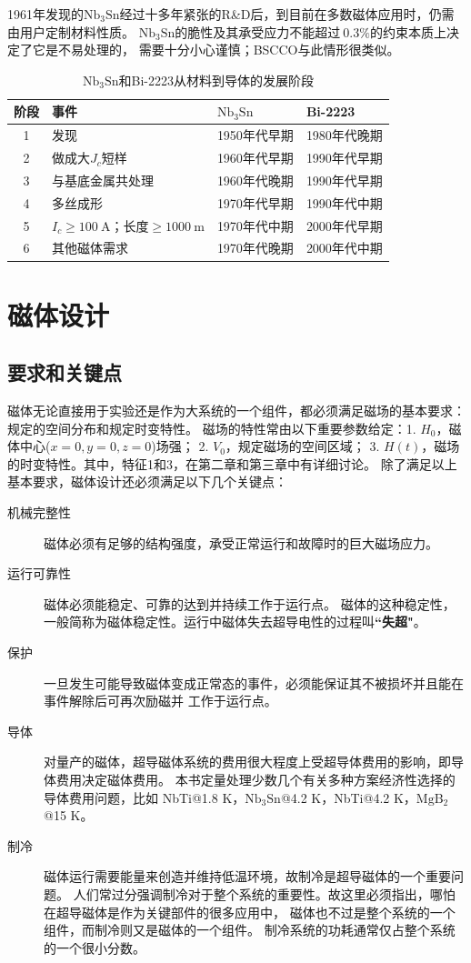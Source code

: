 1961年发现的$\mathrm{Nb_3Sn}$经过十多年紧张的R\&D后，到目前在多数磁体应用时，仍需由用户定制材料性质。
$\mathrm{Nb_3Sn}$的脆性及其承受应力不能超过$~0.3\%$的约束本质上决定了它是不易处理的，
需要十分小心谨慎；BSCCO与此情形很类似。
\begin{table}[htbp]\small
  \centering
  \caption{$\mathrm{Nb_3Sn}$和Bi-2223从材料到导体的发展阶段} \label{scstage}
\begin{tabular}{|c|l|l|l|}
  \hline
  阶段&事件& $\mathrm{Nb_3Sn}$ &Bi-2223 \\ \hline
1 & 发现 & 1950年代早期& 1980年代晚期 \\ \hline
2 & 做成大$J_c$短样 & 1960年代早期 & 1990年代早期\\ \hline
3 &与基底金属共处理&1960年代晚期&1990年代早期\\ \hline
4 &多丝成形&1970年代早期&1990年代中期\\ \hline
5 &$I_c\ge 100\ \mathrm{A}$；长度$\ge 1000\ \mathrm{m}$ &1970年代中期&2000年代早期\\ \hline
6 &其他磁体需求&1970年代晚期&2000年代中期\\
  \hline
\end{tabular}
\end{table}


\section{磁体设计}
\subsection{要求和关键点}
磁体无论直接用于实验还是作为大系统的一个组件，都必须满足磁场的基本要求：规定的空间分布和规定时变特性。
磁场的特性常由以下重要参数给定：1. $H_0$，磁体中心($x=0, y=0, z=0$)场强；
2. $V_0$，规定磁场的空间区域；
3. $H(t)$，磁场的时变特性。其中，特征1和3，在第二章和第三章中有详细讨论。
除了满足以上基本要求，磁体设计还必须满足以下几个关键点：
\begin{description}
  \item[机械完整性] 磁体必须有足够的结构强度，承受正常运行和故障时的巨大磁场应力。
  \item[运行可靠性] 磁体必须能稳定、可靠的达到并持续工作于运行点。
  磁体的这种稳定性，一般简称为磁体稳定性。运行中磁体失去超导电性的过程叫\textbf{``失超"}。
  \item[保护] 一旦发生可能导致磁体变成正常态的事件，必须能保证其不被损坏并且能在事件解除后可再次励磁并
  工作于运行点。
  \item[导体] 对量产的磁体，超导磁体系统的费用很大程度上受超导体费用的影响，即导体费用决定磁体费用。
  本书定量处理少数几个有关多种方案经济性选择的导体费用问题，比如
NbTi@1.8 K，$\mathrm{Nb_3Sn}$@4.2 K，NbTi@4.2 K，$\mathrm{MgB_2}$@15 K。
  \item[制冷] 磁体运行需要能量来创造并维持低温环境，故制冷是超导磁体的一个重要问题。
  人们常过分强调制冷对于整个系统的重要性。故这里必须指出，哪怕在超导磁体是作为关键部件的很多应用中，
  磁体也不过是整个系统的一个组件，而制冷则又是磁体的一个组件。
  制冷系统的功耗通常仅占整个系统的一个很小分数。
\end{description}

